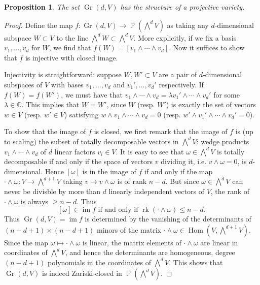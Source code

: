 \documentclass{article}
\newcommand{\C}{\mathbb{C}}
\theoremstyle{plain}
\newtheorem{proposition}[theorem]{Proposition}
\theoremstyle{definition}
\theoremstyle{remark}
\DeclareMathOperator{\Gr}{Gr}
\DeclareMathOperator{\PP}{\mathbb{P}}
\DeclareMathOperator{\Hom}{Hom}
\DeclareMathOperator{\im}{im}
\DeclareMathOperator{\rk}{rk}
\begin{document}
\begin{proposition}
    The set $\Gr(d,V)$ has the structure of a projective variety.
\end{proposition}
\begin{proof}
    Define the map $f:\Gr(d,V)\to\PP(\bigwedge^dV)$ as taking any $d$-dimensional subspace $W\subset V$ to the
    line $\bigwedge^d W\subset \bigwedge^dV$. More explicitly, if we fix a basis $v_1,\ldots, v_d$ for $W$,
    we find that $f(W)=[v_1\wedge\cdots\wedge v_d]$. Now it suffices to show that $f$ is injective with closed image.

    Injectivity is straightforward: suppose $W,W'\subset V$ are a pair of $d$-dimensional subspaces of $V$
    with bases $v_1,\ldots,v_d$ and $v_1',\ldots,v_d'$ respectively. If $f(W)=f(W')$, we must have that
    $v_1\wedge\cdots\wedge v_d=\lambda v_1'\wedge\cdots\wedge v_d'$ for some $\lambda\in\C$. This implies
    that $W=W'$, since $W$ (resp. $W'$) is exactly the set of vectors $w\in V$ (resp. $w'\in V$) satisfying
    $w\wedge v_1\wedge\cdots\wedge v_d=0$ (resp. $w'\wedge v_1'\wedge\cdots\wedge v_d'=0$).

    To show that the image of $f$ is closed, we first remark that the image of $f$ is (up to scaling) the subset
    of totally decomposable vectors in $\bigwedge^dV$: wedge products $v_1\wedge\cdots\wedge v_d$
    of $d$ linear factors $v_i\in V$. It is easy to see that $\omega\in\bigwedge^dV$ is totally decomposable if
    and only if the space of vectors $v$ dividing it, i.e. $v\wedge\omega=0$, is $d$-dimensional.
    Hence $[\omega]$ is in the image of $f$ if and only if the map $\cdot\wedge\omega:V\to \bigwedge^{d+1}V$
    taking $v\mapsto v\wedge \omega$ is of rank $n-d$. But since $\omega\in\bigwedge^dV$ can never
    be divisble by more than $d$ linearly independent vectors of $V$, the rank of $\cdot\wedge\omega$
    is always $\geqslant n-d$. Thus
    \[ [\omega]\in\im f\text{ if and only if }\rk(\cdot\wedge\omega)\leqslant n-d.\]
    Thus $\Gr(d,V)=\im f$ is determined by the vanishing of the determinants of $(n-d+1)\times(n-d+1)$ minors
    of the matrix $\cdot\wedge\omega\in\Hom(V,\bigwedge^{d+1}V)$.
    Since the map $\omega\mapsto \cdot\wedge\omega$ is linear, the matrix elements of $\cdot\wedge\omega$
    are linear in coordinates of $\bigwedge^dV$, and hence the determinants are homogeneous, degree $(n-d+1)$
    polynomials in the coordinates of $\bigwedge^dV$. This shows that $\Gr(d,V)$ is indeed
    Zariski-closed in $\PP(\bigwedge^dV)$.
\end{proof}
\end{document}

